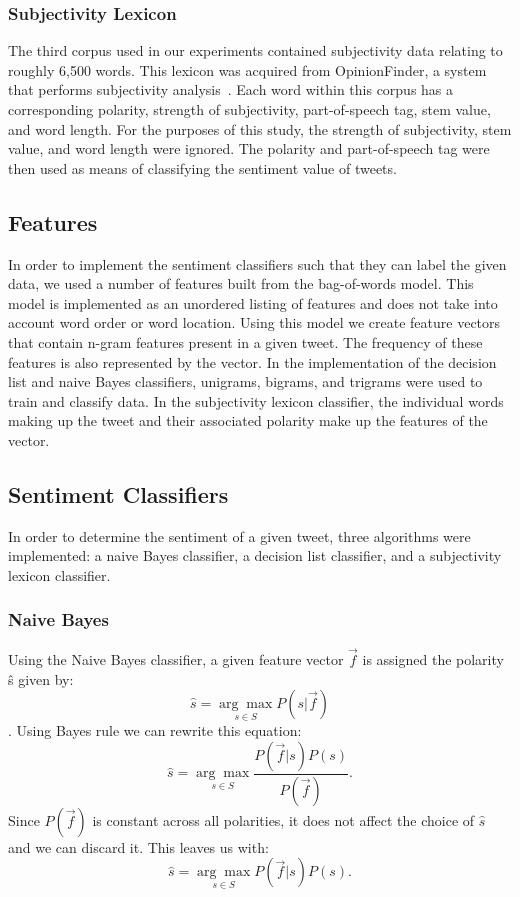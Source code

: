 \documentclass[11pt]{article}
\begin{document}
\subsubsection*{Subjectivity Lexicon}
The third corpus used in our experiments contained subjectivity data relating to roughly 6,500 words. This lexicon was acquired from OpinionFinder, a system that performs subjectivity analysis~\cite{wilson2005opinionfinder}. Each word within this corpus has a corresponding polarity, strength of subjectivity, part-of-speech tag, stem value, and word length. For the purposes of this study, the strength of subjectivity, stem value, and word length were ignored. The polarity and part-of-speech tag were then used as means of classifying the sentiment value of tweets.

\subsection{Features}
In order to implement the sentiment classifiers such that they can label the given data, we used a number of features built from the bag-of-words model. This model is implemented as an unordered listing of features and does not take into account word order or word location. Using this model we create feature vectors that contain n-gram features present in a given tweet. The frequency of these features is also represented by the vector. In the implementation of the decision list and naive Bayes classifiers, unigrams, bigrams, and trigrams were used to train and classify data. In the subjectivity lexicon classifier, the individual words making up the tweet and their associated polarity make up the features of the vector. 

\subsection{Sentiment Classifiers}
In order to determine the sentiment of a given tweet, three algorithms were implemented: a naive Bayes classifier, a decision list classifier, and a subjectivity lexicon classifier.
\subsubsection*{Naive Bayes}
Using the Naive Bayes classifier, a given feature vector $\vec{f}$ is assigned
the polarity \^{s} given by: 
$$\hat{s} = \underset{{s}\in{S}}{\arg\max}P(s|\vec{f})$$.
Using Bayes rule we can rewrite this equation:
\[\hat{s} = \underset{{s}\in{S}}{\arg\max}{\frac{P(\vec{f}|s)P(s)}{P(\vec{f})}}.\]
Since $P(\vec{f})$ is constant across all polarities, it
does not affect the choice of $\hat{s}$ and we can discard it. This leaves us with:
\[\hat{s} = \underset{{s}\in{S}}{\arg\max}{P(\vec{f}|s)P(s)}.\]
\end{document}
